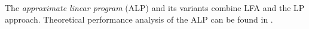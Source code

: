 
The \emph{approximate linear program} (ALP) \cite{ALP,CS,SALP,ALP-Bor} and its variants combine LFA and the LP approach. Theoretical performance analysis of the ALP can be found in \cite{ALP}.

